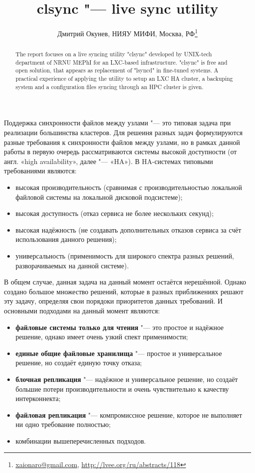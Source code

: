 \documentclass[10pt, a5paper]{article}
\begin{document}
\title{clsync "--- live sync utility}
\author{Дмитрий Окунев, НИЯУ МИФИ, Москва, РФ\footnote{\url{xaionaro@gmail.com}, \url{http://lvee.org/ru/abstracts/118}}}
\maketitle
\begin{abstract}
The report focuses on a live syncing utility "clsync" developed by UNIX-tech department of NRNU MEPhI for an LXC-based infrastructure. "clsync" is free and open solution, that appears as replacement of "lsyncd" in fine-tuned systems. A practical experience of applying the utility to setup an LXC HA cluster, a backuping system and a configuration files syncing through an HPC cluster is given.
\end{abstract}
Поддержка синхронности файлов между узлами "--- это типовая задача при реализации большинства кластеров. Для решеиня разных задач формулируются разные требования к синхронности файлов между узлами, но в рамках данной работы в первую очередь рассматриваются системы высокой доступности (от англ. «high availa\-bility», далее "--- «HA»). В HA-системах типовыми требованиями являются:

\begin{itemize}
  \item высокая производительность (сравнимая с производительностью локальной файловой системы на локальной дисковой подсистеме);
  \item высокая доступность (отказ сервиса не более нескольких секунд);
  \item высокая надёжность (не создавать дополнительных отказов сервиса за счёт использования данного решения);
  \item универсальность (применимость для широкого спектра разных решений, разворачиваемых на данной системе).
\end{itemize}

В общем случае, данная задача на данный момент остаётся нерешённой. Однако создано большое множество решений, которые в разных приближениях решают эту задачу, определяя свои порядоки приоритетов данных требований. И основными подходами на данный момент являются:

\begin{itemize}
  \item \textbf{файловые системы только для чтения} "--- это простое и надёжное решение, однако имеет очень узкий спект применимости;
  \item \textbf{единые общие файловые хранилища} "--- простое и универсальное решение, но создаёт единую точку отказа;
  \item \textbf{блочная репликация} "--- надёжное и универсальное решение, но создаёт большие потери производительности и очень чувствительно к качеству интерконнекта;
  \item \textbf{файловая репликация} "--- компромиссное решение, которое не выполняет ни одно требование полностью;
  \item комбинации вышеперечисленных подходов.
\end{itemize}
\end{document}
